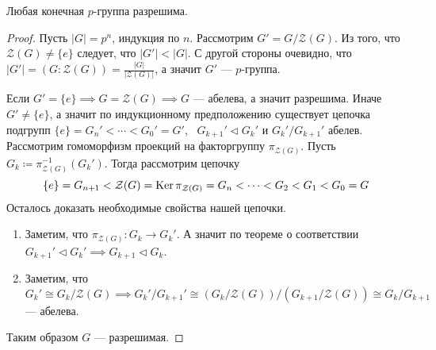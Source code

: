 \documentclass[../main.tex]{subfiles}
\begin{document}
\begin{corollary*}
  Любая конечная $p$-группа разрешима.
\end{corollary*}
\begin{proof}
  Пусть $|G| = p^n$, индукция по $n$. Рассмотрим $G' = G / \mathcal{Z}(G)$. Из того, что $\mathcal{Z}(G) \neq \{e\}$ следует, что $|G'| < |G|$. С другой стороны очевидно,  что $|G'| = (G : \mathcal{Z}(G)) = \frac{|G|}{|\mathcal{Z}(G)|}$, а значит $G'$ --- $p$-группа.

  Если $G' = \{e\} \implies G = \mathcal{Z}(G) \implies G$ --- абелева, а значит разрешима. Иначе $G' \neq \{e\}$, а значит по индукционному предположению существует цепочка подгрупп $\{e\} = G_n' < \dotsb < G_0' = G'$, \, $G_{k + 1}' \triangleleft G_k'$ и $G_k' / G_{k + 1}'$ абелев. Рассмотрим гомоморфизм проекций на факторгруппу $\pi_{\mathcal{Z}(G)}$. Пусть $G_k \coloneqq \pi_{\mathcal{Z}(G)}^{-1}(G_k')$. Тогда рассмотрим цепочку
  \begin{equation*}
    \{e\} = G_{n + 1} < \mathcal{Z}(G) = \operatorname{Ker} \pi_{\mathcal{Z}(G)} = G_n < \dotsb < G_2 < G_1 < G_0 = G
  \end{equation*}
  Осталось доказать необходимые свойства нашей цепочки.
  \begin{enumerate}
    \item Заметим, что $\pi_{\mathcal{Z}(G)}\colon G_k \longrightarrow G_k'$. А значит по теореме о соответствии $G_{k + 1}' \triangleleft G_k' \implies G_{k + 1} \triangleleft G_k$.
    \item Заметим, что $G_k' \cong G_k / \mathcal{Z}(G) \implies G_k' / G_{k + 1}' \cong (G_k / \mathcal{Z}(G)) / (G_{k + 1} / \mathcal{Z}(G)) \cong G_k/G_{k + 1}$ --- абелева.
  \end{enumerate}
  Таким образом $G$ --- разрешимая.
\end{proof}
\end{document}
